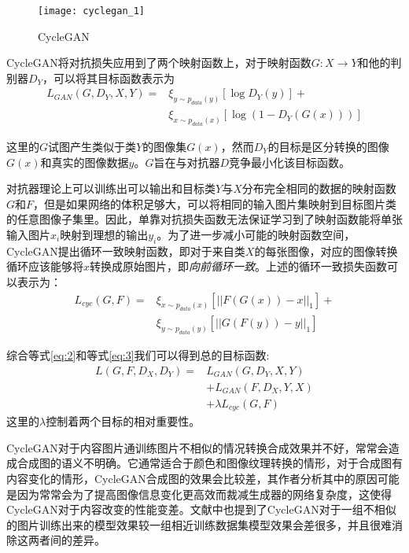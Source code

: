 \begin{figure}[h]
    \centering
    \texttt{[image: cyclegan\_1]}
    \caption{CycleGAN}
    \label{lable-cyclgan} 
\end{figure}

CycleGAN将对抗损失应用到了两个映射函数上，对于映射函数$G:X\to Y$和他的判别器$D_Y$，可以将其目标函数表示为
\begin{equation}
\begin{aligned}
    \label{eq:2}
    L_{GAN}(G,D_Y,X,Y)= & \xi_{y\sim p_{data}(y)}[\log D_Y(y)] + \\
    & \xi_{x\sim p_{data}(x)}[\log (1-D_Y(G(x)))]
\end{aligned}
\end{equation}

这里的$G$试图产生类似于类$Y$的图像集$G(x)$，然而$D_Y$的目标是区分转换的图像$G(x)$和真实的图像数据$y$。$G$旨在与对抗器$D$竞争最小化该目标函数。

对抗器理论上可以训练出可以输出和目标类$Y$与$X$分布完全相同的数据的映射函数$G$和$F$，但是如果网络的体积足够大，可以将相同的输入图片集映射到目标图片类的任意图像子集里。因此，单靠对抗损失函数无法保证学习到了映射函数能将单张输入图片$x_i$映射到理想的输出$y_i$。为了进一步减小可能的映射函数空间，CycleGAN提出循环一致映射函数，即对于来自类$X$的每张图像，对应的图像转换循环应该能够将$x$转换成原始图片，即\textit{向前循环一致}。上述的循环一致损失函数可以表示为：
\begin{equation}
\begin{aligned}
    \label{eq:3}
    L_{cyc}(G,F)= & \xi_{x\sim p_{data}(x)}[||F(G(x))-x||_1] + \\
    & \xi_{y\sim p_{data}(y)}[||G(F(y))-y||_1]
\end{aligned}
\end{equation}

综合等式\ref{eq:2}和等式\ref{eq:3}我们可以得到总的目标函数:
\begin{equation}
\begin{aligned}
    L(G, F, D_X, D_Y) = & L_{GAN}(G,D_Y, X, Y) \\
    & + L_{GAN}(F,D_X, Y, X) \\
    & + \lambda L_{cyc}(G, F)
\end{aligned}
\end{equation}
这里的$\lambda$控制着两个目标的相对重要性。

CycleGAN对于内容图片通训练图片不相似的情况转换合成效果并不好，常常会造成合成图的语义不明确。它通常适合于颜色和图像纹理转换的情形，对于合成图有内容变化的情形，CycleGAN合成图的效果会比较差，其作者分析其中的原因可能是因为常常会为了提高图像信息变化更高效而裁减生成器的网络复杂度，这使得CycleGAN对于内容改变的性能变差。文献\cite{CycleGAN}中也提到了CycleGAN对于一组不相似的图片训练出来的模型效果较一组相近训练数据集模型效果会差很多，并且很难消除这两者间的差异。

